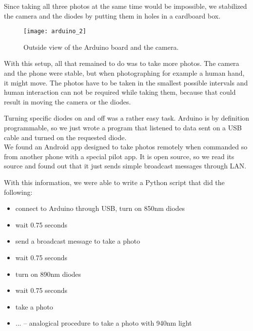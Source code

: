             Since taking all three photos at the same time would be impossible,
            we stabilized the camera and the diodes by putting them in holes
            in a cardboard box.

            \begin{figure}[H]
                \caption{Outside view of the Arduino board and the camera.}
                \centering
                \texttt{[image: arduino\_2]}
                \label{fig:arduino_2}
            \end{figure}

            With this setup, all that remained to do was to take more photos.
            The camera and the phone were stable, but when photographing for example
            a human hand, it might move.
            The photos have to be taken in the smallest possible intervals
            and human interaction can not be required while taking them,
            because that could result in moving the camera or the diodes.

            Turning specific diodes on and off was a rather easy task.
            Arduino is by definition programmable, so we just wrote a program that
            listened to data sent on a USB cable and turned on the requested diode.\\
            We found an Android app \cite{opencameraremote} designed to take photos
            remotely when commanded so from another phone with a special pilot app.
            It is open source, so we read its source and found out that it just sends
            simple broadcast messages through LAN.

            With this information, we were able to write a Python script that did the
            following:

            \begin{itemize}
                \item connect to Arduino through USB, turn on 850nm diodes
                \item wait 0.75 seconds
                \item send a broadcast message to take a photo
                \item wait 0.75 seconds
                \item turn on 890nm diodes
                \item wait 0.75 seconds
                \item take a photo
                \item ... -- analogical procedure to take a photo with 940nm light
            \end{itemize}

